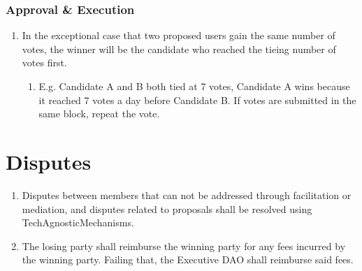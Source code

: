 \subsubsection*{Approval \& Execution}
\begin{enumerate}
	\item In the exceptional case that two proposed users gain the same number of votes, the winner will be the candidate who reached the tieing number of votes first.
	\begin{enumerate}
		\item E.g. Candidate A and B both tied at 7 votes, Candidate A wins because it reached 7 votes a day before Candidate B.
		If votes are submitted in the same block, repeat the vote.
	\end{enumerate}

\end{enumerate}


\section{Disputes}

\begin{enumerate}
	\item Disputes between members that can not be addressed through facilitation or mediation, and disputes related to proposals shall be resolved using \gls{TechAgnosticMechanisms}.
	\item The losing party shall reimburse the winning party for any fees incurred by the winning party. Failing that, the Executive \ac{DAO} shall reimburse said fees.
\end{enumerate}


